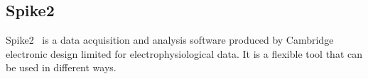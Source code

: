 \subsection{Spike2}
Spike2~\cite{spike2} is a data acquisition and analysis software produced by Cambridge electronic design limited for electrophysiological data. It is a flexible tool that can be used in different ways.


